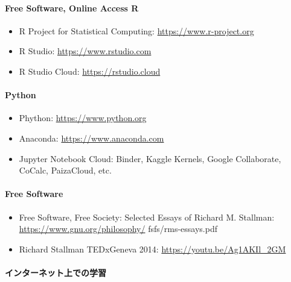 \documentclass[
]{book}
\providecommand{\tightlist}{%
  \setlength{\itemsep}{0pt}\setlength{\parskip}{0pt}}
\theoremstyle{definition}
\theoremstyle{definition}
\theoremstyle{definition}
\theoremstyle{definition}
\theoremstyle{remark}
\begin{document}
\hypertarget{free-software-online-access-r}{%
\paragraph{Free Software, Online Access R}\label{free-software-online-access-r}}

\begin{itemize}
\tightlist
\item
  R Project for Statistical Computing: \url{https://www.r-project.org}
\item
  R Studio: \url{https://www.rstudio.com}
\item
  R Studio Cloud: \url{https://rstudio.cloud}
\end{itemize}

\hypertarget{python}{%
\paragraph{Python}\label{python}}

\begin{itemize}
\tightlist
\item
  Phython: \url{https://www.python.org}
\item
  Anaconda: \url{https://www.anaconda.com}
\item
  Jupyter Notebook Cloud: Binder, Kaggle Kernels, Google Collaborate, CoCalc, PaizaCloud, etc.
\end{itemize}

\hypertarget{free-software}{%
\paragraph{Free Software}\label{free-software}}

\begin{itemize}
\tightlist
\item
  Free Software, Free Society: Selected Essays of Richard M. Stallman: \url{https://www.gnu.org/philosophy/} fsfs/rms-essays.pdf
\item
  Richard Stallman TEDxGeneva 2014: \url{https://youtu.be/Ag1AKIl_2GM}
\end{itemize}

\hypertarget{ux30a4ux30f3ux30bfux30fcux30cdux30c3ux30c8ux4e0aux3067ux306eux5b66ux7fd2}{%
\paragraph{インターネット上での学習}\label{ux30a4ux30f3ux30bfux30fcux30cdux30c3ux30c8ux4e0aux3067ux306eux5b66ux7fd2}}
\end{document}
